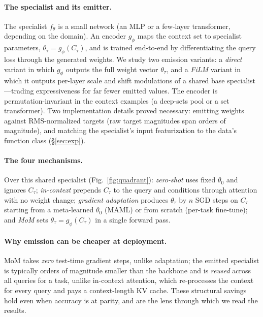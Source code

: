 \documentclass[11pt]{article}
\begin{document}
\paragraph{The specialist and its emitter.} The specialist $f_\theta$ is a small
network (an MLP or a few-layer transformer, depending on the domain). An encoder
$g_\phi$ maps the context set to specialist parameters,
$\theta_\tau = g_\phi(C_\tau)$, and is trained end-to-end by differentiating the
query loss through the generated weights. We study two emission variants: a
\emph{direct} variant in which $g_\phi$ outputs the full weight vector $\theta_\tau$,
and a \emph{FiLM} variant in which it outputs per-layer scale and shift modulations
of a shared base specialist---trading expressiveness for far fewer emitted values.
The encoder is permutation-invariant in the context examples (a deep-sets pool or a
set transformer). Two implementation details proved necessary: emitting weights
against RMS-normalized targets (raw target magnitudes span orders of magnitude), and
matching the specialist's input featurization to the data's function class
(\S\ref{sec:exp}).

\paragraph{The four mechanisms.} Over this shared specialist (Fig.~\ref{fig:quadrant}):
\emph{zero-shot} uses fixed $\theta_0$ and ignores $C_\tau$; \emph{in-context}
prepends $C_\tau$ to the query and conditions through attention with no weight change;
\emph{gradient adaptation} produces $\theta_\tau$ by $n$ SGD steps on $C_\tau$
starting from a meta-learned $\theta_0$ (MAML) or from scratch (per-task fine-tune);
and \emph{MoM} sets $\theta_\tau = g_\phi(C_\tau)$ in a single forward pass.

\paragraph{Why emission can be cheaper at deployment.} MoM takes \emph{zero}
test-time gradient steps, unlike adaptation; the emitted specialist is typically
orders of magnitude smaller than the backbone and is \emph{reused} across all queries
for a task, unlike in-context attention, which re-processes the context for every
query and pays a context-length KV cache. These structural savings hold even when
accuracy is at parity, and are the lens through which we read the results.

\end{document}
